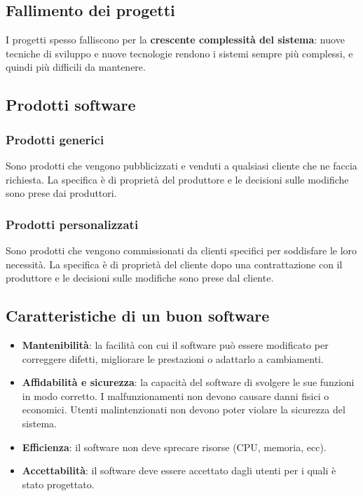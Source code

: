 \documentclass[a4paper]{article}
\begin{document}
\subsection{Fallimento dei progetti}
I progetti spesso falliscono per la \textbf{crescente complessità del sistema}: nuove 
tecniche di sviluppo e nuove tecnologie rendono i sistemi sempre più complessi, e quindi 
più difficili da mantenere.

\subsection{Prodotti software}
\subsubsection{Prodotti generici}
Sono prodotti che vengono pubblicizzati e venduti a qualsiasi cliente che ne faccia 
richiesta. La specifica è di proprietà del produttore e le decisioni sulle modifiche
sono prese dai produttori.

\subsubsection{Prodotti personalizzati}
Sono prodotti che vengono commissionati da clienti specifici per soddisfare le loro
necessità. La specifica è di proprietà del cliente dopo una contrattazione con il
produttore e le decisioni sulle modifiche sono prese dal cliente.

\subsection{Caratteristiche di un buon software}
\begin{itemize}
  \item \textbf{Mantenibilità}: la facilità con cui il software può essere modificato
  per correggere difetti, migliorare le prestazioni o adattarlo a cambiamenti.

  \item \textbf{Affidabilità e sicurezza}: la capacità del software di svolgere le sue
  funzioni in modo corretto. I malfunzionamenti non devono causare danni fisici o economici.
  Utenti malintenzionati non devono poter violare la sicurezza del sistema.
  
  \item \textbf{Efficienza}: il software non deve sprecare risorse (CPU, memoria, ecc).

  \item \textbf{Accettabilità}: il software deve essere accettato dagli utenti per i quali
  è stato progettato.
\end{itemize}
\end{document}
